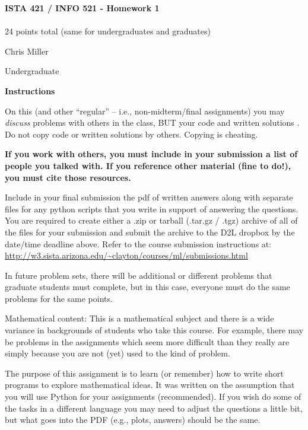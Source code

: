 \documentclass[10pt]{article}
\begin{document}
\begin{center}
    {\Large {\bf ISTA 421 / INFO 521 - Homework 1}} \\
     \\
    24 points total (same for undergraduates and graduates) \\
    \vspace{1cm}
\end{center}

\begin{flushright}
Chris Miller  %

Undergraduate %
\end{flushright}

\vspace{1cm}

{\Large {\bf Instructions}}

On this (and other ``regular'' -- i.e., non-midterm/final assignments) you may {\em discuss} problems with others in the class, BUT your code and written solutions .  Do not copy code or written solutions by others.  Copying is cheating.

{\bf If you work with others, you must include in your submission a list of people you talked with.  If you reference other material (fine to do!), you must cite those resources.}

Include in your final submission the pdf of written answers along with separate files for any python scripts that you write in support of answering the questions. 
You are required to create either a .zip or tarball (.tar.gz / .tgz) archive of all of the files for your submission and submit the archive to the D2L dropbox by the date/time deadline above.
Refer to the course submission instructions at: \\
\url{http://w3.sista.arizona.edu/~clayton/courses/ml/submissions.html}

In future problem sets, there will be additional or different problems that graduate students must complete, but in this case, everyone must do the same problems for the same points.

Mathematical content: This is a mathematical subject and there is a wide variance in backgrounds of students who take this course. For example, there may be problems in the assignments which seem more difficult than they really are simply because you are not (yet) used to the kind of problem. 

The purpose of this assignment is to learn (or remember) how to write short programs to explore mathematical ideas. It was written on the assumption that you will use Python for your assignments (recommended). If you wish do some of the tasks in a different language you may need to adjust the questions a little bit, but what goes into the PDF (e.g., plots, answers) should be the same. 
\end{document}
